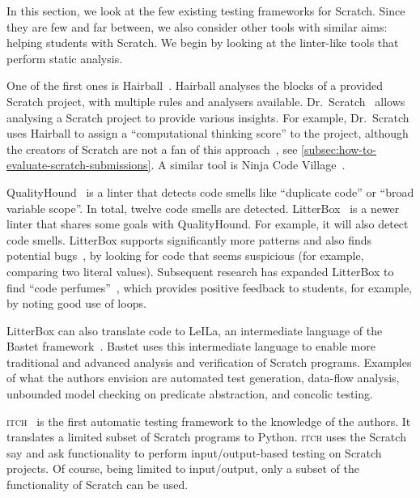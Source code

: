\documentclass[../main]{subfiles}
\begin{document}
In this section, we look at the few existing testing frameworks for Scratch.
Since they are few and far between, we also consider other tools with similar aims: helping students with Scratch.
We begin by looking at the linter-like tools that perform static analysis.

One of the first ones is Hairball~\autocite{boeHairballLintinspiredStatic2013}.
Hairball analyses the blocks of a provided Scratch project, with multiple rules and analysers available.
Dr.\ Scratch~\autocite{moreno-leonDrScratchWeb2015} allows analysing a Scratch project to provide various insights.
For example, Dr.\ Scratch uses Hairball to assign a ``computational thinking score'' to the project, although the creators of Scratch are not a fan of this approach~\autocite{resnickCodingCrossroads2020}, see \cref{subsec:how-to-evaluate-scratch-submissions}.
A similar tool is Ninja Code Village~\autocite{otaNinjaCodeVillage2016}.

QualityHound~\autocite{techapalokulQualityHoundOnline2017} is a linter that detects code smells like ``duplicate code'' or ``broad variable scope''.
In total, twelve code smells are detected.
LitterBox~\autocite{fraserLitterBoxLinterScratch2021} is a newer linter that shares some goals with QualityHound.
For example, it will also detect code smells.
LitterBox supports significantly more patterns and also finds potential bugs~\autocite{fradrichCommonBugsScratch2020}, by looking for code that seems suspicious (for example, comparing two literal values).
Subsequent research has expanded LitterBox to find ``code perfumes''~\autocite{obermullerCodePerfumesReporting2021}, which provides positive feedback to students, for example, by noting good use of loops.

LitterBox can also translate code to LeILa, an intermediate language of the Bastet framework~\autocite{stahlbauerVerifiedScratchProgram2020}.
Bastet uses this intermediate language to enable more traditional and advanced analysis and verification of Scratch programs.
Examples of what the authors envision are automated test generation, data-flow analysis, unbounded model checking on predicate abstraction, and concolic testing.

\textsc{itch}~\autocite{johnsonITCHIndividualTesting2016} is the first automatic testing framework to the knowledge of the authors.
It translates a limited subset of Scratch programs to Python.
\textsc{itch} uses the Scratch say and ask functionality to perform input/output-based testing on Scratch projects.
Of course, being limited to input/output, only a subset of the functionality of Scratch can be used.
\end{document}

